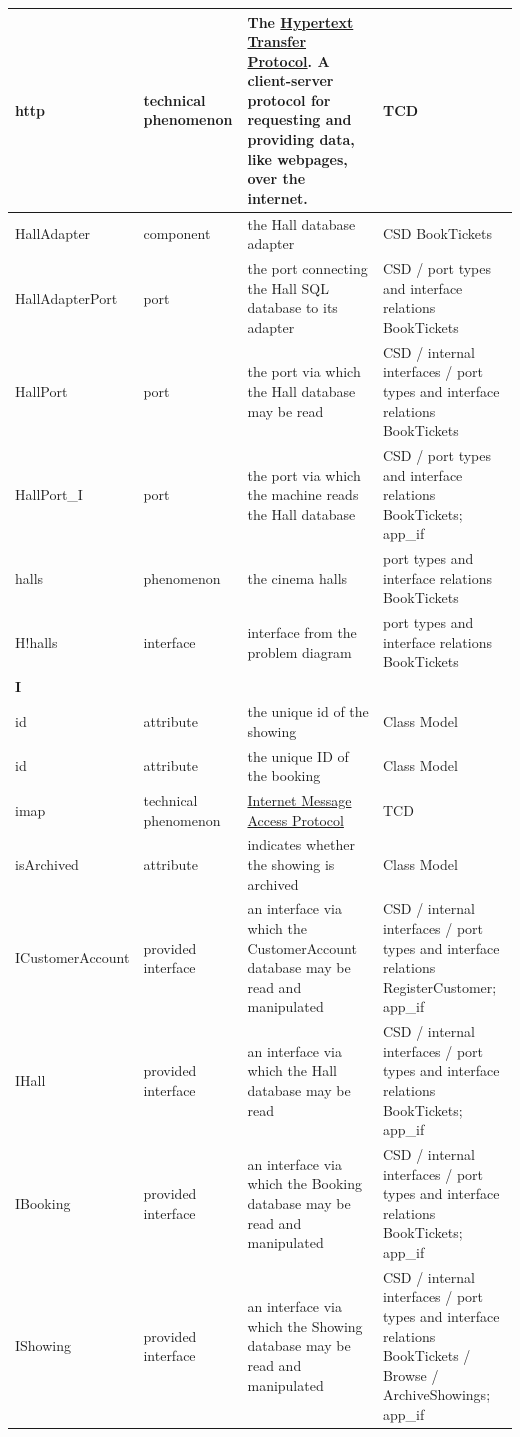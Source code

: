 \documentclass[a4paper,10pt,titlepage,bibtotoc,bibtotocnumbered]{scrreprt}
\begin{document}
\begin{longtable}{|p{.4\linewidth}|p{.2\linewidth}|p{.2\linewidth}|p{.2\linewidth}|}
\hline
http & technical phenomenon & The \href{https://datatracker.ietf.org/doc/html/rfc9112}{Hypertext Transfer Protocol}. A client-server protocol for requesting and providing data, like webpages, over the internet. & TCD\\
\hline
HallAdapter & component & the Hall database adapter & CSD BookTickets\\
\hline
HallAdapterPort & port & the port connecting the Hall SQL database to its adapter & CSD / port types and interface relations BookTickets\\
\hline
HallPort & port & the port via which the Hall database may be read & CSD / internal interfaces / port types and interface relations BookTickets\\
\hline
HallPort\_I & port & the port via which the machine reads the Hall database & CSD / port types and interface relations BookTickets; app\_if\\
\hline
halls & phenomenon & the cinema halls & port types and interface relations BookTickets\\
\hline
H!{halls} & interface & interface from the problem diagram & port types and interface relations BookTickets\\
\hline
\multicolumn{4}{|l|}{\textbf{I}}\\
\hline
id & attribute & the unique id of the showing & Class Model\\
\hline
id & attribute & the unique ID of the booking & Class Model\\
\hline
imap & technical phenomenon & \href{https://tools.ietf.org/html/rfc3501}{Internet Message Access Protocol} & TCD\\
\hline
isArchived & attribute & indicates whether the showing is archived & Class Model\\
\hline
ICustomerAccount & provided interface & an interface via which the CustomerAccount database may be read and manipulated & CSD / internal interfaces / port types and interface relations RegisterCustomer; app\_if\\
\hline
IHall & provided interface & an interface via which the Hall database may be read & CSD / internal interfaces / port types and interface relations BookTickets; app\_if\\
\hline
IBooking & provided interface & an interface via which the Booking database may be read and manipulated & CSD / internal interfaces / port types and interface relations BookTickets; app\_if\\
\hline
IShowing & provided interface & an interface via which the Showing database may be read and manipulated & CSD / internal interfaces / port types and interface relations BookTickets / Browse / ArchiveShowings; app\_if\\

\end{longtable}
\end{document}

